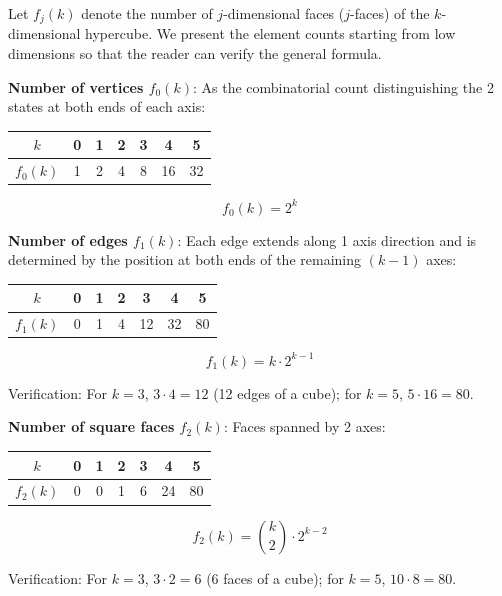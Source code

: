\documentclass[
  a4paper,11pt]{article}
\newcounter{none}
\theoremstyle{definition}
\theoremstyle{remark}
\begin{document}
Let \(f_j(k)\) denote the number of \(j\)-dimensional faces
(\(j\)-faces) of the \(k\)-dimensional hypercube. We present the element
counts starting from low dimensions so that the reader can verify the
general formula.

\textbf{Number of vertices \(f_0(k)\)}: As the combinatorial count
distinguishing the 2 states at both ends of each axis:

{\def\LTcaptype{none} %
\begin{longtable}[]{@{}ccccccc@{}}
\toprule\noalign{}
\(k\) & 0 & 1 & 2 & 3 & 4 & 5 \\
\midrule\noalign{}
\endhead
\bottomrule\noalign{}
\endlastfoot
\(f_0(k)\) & 1 & 2 & 4 & 8 & 16 & 32 \\
\end{longtable}
}

\[f_0(k) = 2^k\]

\textbf{Number of edges \(f_1(k)\)}: Each edge extends along 1 axis
direction and is determined by the position at both ends of the
remaining \((k-1)\) axes:

{\def\LTcaptype{none} %
\begin{longtable}[]{@{}ccccccc@{}}
\toprule\noalign{}
\(k\) & 0 & 1 & 2 & 3 & 4 & 5 \\
\midrule\noalign{}
\endhead
\bottomrule\noalign{}
\endlastfoot
\(f_1(k)\) & 0 & 1 & 4 & 12 & 32 & 80 \\
\end{longtable}
}

\[f_1(k) = k \cdot 2^{k-1}\]

Verification: For \(k=3\), \(3 \cdot 4 = 12\) (12 edges of a cube); for
\(k=5\), \(5 \cdot 16 = 80\).

\textbf{Number of square faces \(f_2(k)\)}: Faces spanned by 2 axes:

{\def\LTcaptype{none} %
\begin{longtable}[]{@{}ccccccc@{}}
\toprule\noalign{}
\(k\) & 0 & 1 & 2 & 3 & 4 & 5 \\
\midrule\noalign{}
\endhead
\bottomrule\noalign{}
\endlastfoot
\(f_2(k)\) & 0 & 0 & 1 & 6 & 24 & 80 \\
\end{longtable}
}

\[f_2(k) = \binom{k}{2} \cdot 2^{k-2}\]

Verification: For \(k=3\), \(3 \cdot 2 = 6\) (6 faces of a cube); for
\(k=5\), \(10 \cdot 8 = 80\).
\end{document}

